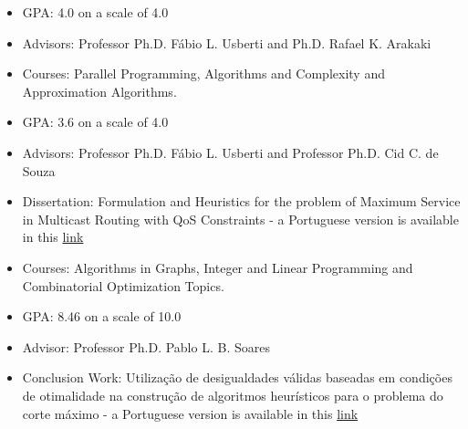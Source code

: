 \documentclass[10pt,a4paper,ragged2e,withhyper]{altacv}
\begin{document}
    \begin{paracol}{1}
            \medskip
            \medskip
            \begin{itemize}
            \item{GPA: 4.0 on a scale of 4.0}
			      \item{Advisors: Professor Ph.D. Fábio L. Usberti and Ph.D. Rafael K. Arakaki}
			      \item{Courses: \textcolor{SecondaryColor}{Parallel Programming},
                \textcolor{SecondaryColor}{Algorithms and Complexity} and
                \textcolor{SecondaryColor}{Approximation Algorithms}.}
		      \end{itemize}
            \divider
            \medskip
            \begin{itemize}
            \item{GPA: 3.6 on a scale of 4.0}
			      \item{Advisors: Professor Ph.D. Fábio L. Usberti and Professor Ph.D. Cid C. de Souza}
			      \item{Dissertation: Formulation and Heuristics for the problem of
                Maximum Service in Multicast Routing with QoS Constraints -
                a Portuguese version is available in this \href{https://hdl.handle.net/20.500.12733/1641777}{\textcolor{ThirdColor}{link}}}
			      \item{Courses: \textcolor{SecondaryColor}{Algorithms in Graphs},
                \textcolor{SecondaryColor}{Integer and Linear Programming} and
                \textcolor{SecondaryColor}{Combinatorial Optimization Topics}.}
		      \end{itemize}
            \divider
            \begin{itemize}
            \item{GPA: 8.46 on a scale of 10.0}
          \item{Advisor: Professor Ph.D. Pablo L. B. Soares}
          \item{Conclusion Work: Utilização de desigualdades válidas baseadas
                em condições de otimalidade na construção de algoritmos
                heurísticos para o problema do corte máximo - a Portuguese
                version is available in this \href{http://www.repositorio.ufc.br/handle/riufc/39085}{\textcolor{ThirdColor}{link}}}
		      \end{itemize}
		      

\end{paracol}
\end{document}
